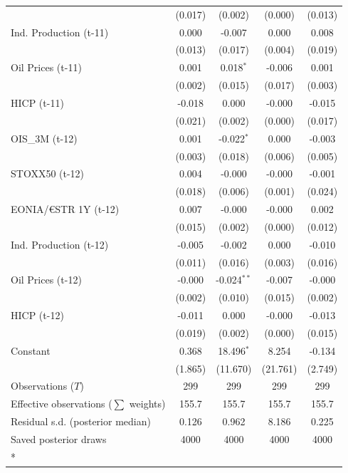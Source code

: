 \begin{longtable}[t]{lcccc}
 & (0.017) & (0.002) & (0.000) & (0.013)\\
Ind. Production (t-11) & 0.000 & -0.007 & 0.000 & 0.008\\
 & (0.013) & (0.017) & (0.004) & (0.019)\\
Oil Prices (t-11) & 0.001 & 0.018$^{*}$ & -0.006 & 0.001\\
 & (0.002) & (0.015) & (0.017) & (0.003)\\
HICP (t-11) & -0.018 & 0.000 & -0.000 & -0.015\\
 & (0.021) & (0.002) & (0.000) & (0.017)\\
OIS\_3M (t-12) & 0.001 & -0.022$^{*}$ & 0.000 & -0.003\\
 & (0.003) & (0.018) & (0.006) & (0.005)\\
STOXX50 (t-12) & 0.004 & -0.000 & -0.000 & -0.001\\
 & (0.018) & (0.006) & (0.001) & (0.024)\\
EONIA/€STR 1Y (t-12) & 0.007 & -0.000 & -0.000 & 0.002\\
 & (0.015) & (0.002) & (0.000) & (0.012)\\
Ind. Production (t-12) & -0.005 & -0.002 & 0.000 & -0.010\\
 & (0.011) & (0.016) & (0.003) & (0.016)\\
Oil Prices (t-12) & -0.000 & -0.024$^{**}$ & -0.007 & -0.000\\
 & (0.002) & (0.010) & (0.015) & (0.002)\\
HICP (t-12) & -0.011 & 0.000 & -0.000 & -0.013\\
 & (0.019) & (0.002) & (0.000) & (0.015)\\
Constant & 0.368 & 18.496$^{*}$ & 8.254 & -0.134\\
 & (1.865) & (11.670) & (21.761) & (2.749)\\
\midrule
Observations ($T$) & 299 & 299 & 299 & 299\\
Effective observations ($\sum$ weights) & 155.7 & 155.7 & 155.7 & 155.7\\
Residual s.d. (posterior median) & 0.126 & 0.962 & 8.186 & 0.225\\
Saved posterior draws & 4000 & 4000 & 4000 & 4000\\*
\end{longtable}
\endgroup{}

